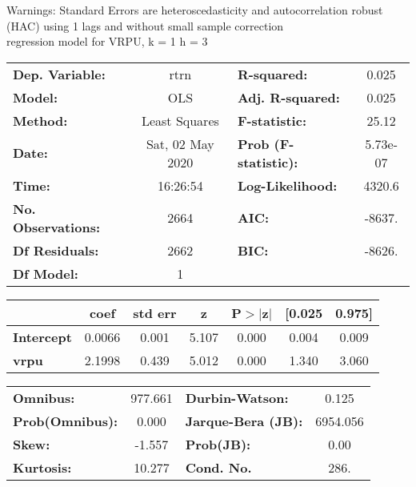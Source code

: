 Warnings: \newline
 [1] Standard Errors are heteroscedasticity and autocorrelation robust (HAC) using 1 lags and without small sample correction\\ 

regression model for VRPU, k = 1 h = 3\begin{center}
\begin{tabular}{lclc}
\toprule
\textbf{Dep. Variable:}    &       rtrn       & \textbf{  R-squared:         } &     0.025   \\
\textbf{Model:}            &       OLS        & \textbf{  Adj. R-squared:    } &     0.025   \\
\textbf{Method:}           &  Least Squares   & \textbf{  F-statistic:       } &     25.12   \\
\textbf{Date:}             & Sat, 02 May 2020 & \textbf{  Prob (F-statistic):} &  5.73e-07   \\
\textbf{Time:}             &     16:26:54     & \textbf{  Log-Likelihood:    } &    4320.6   \\
\textbf{No. Observations:} &        2664      & \textbf{  AIC:               } &    -8637.   \\
\textbf{Df Residuals:}     &        2662      & \textbf{  BIC:               } &    -8626.   \\
\textbf{Df Model:}         &           1      & \textbf{                     } &             \\
\bottomrule
\end{tabular}
\begin{tabular}{lcccccc}
                   & \textbf{coef} & \textbf{std err} & \textbf{z} & \textbf{P$> |$z$|$} & \textbf{[0.025} & \textbf{0.975]}  \\
\midrule
\textbf{Intercept} &       0.0066  &        0.001     &     5.107  &         0.000        &        0.004    &        0.009     \\
\textbf{vrpu}      &       2.1998  &        0.439     &     5.012  &         0.000        &        1.340    &        3.060     \\
\bottomrule
\end{tabular}
\begin{tabular}{lclc}
\textbf{Omnibus:}       & 977.661 & \textbf{  Durbin-Watson:     } &    0.125  \\
\textbf{Prob(Omnibus):} &   0.000 & \textbf{  Jarque-Bera (JB):  } & 6954.056  \\
\textbf{Skew:}          &  -1.557 & \textbf{  Prob(JB):          } &     0.00  \\
\textbf{Kurtosis:}      &  10.277 & \textbf{  Cond. No.          } &     286.  \\
\bottomrule
\end{tabular}
\end{center}

